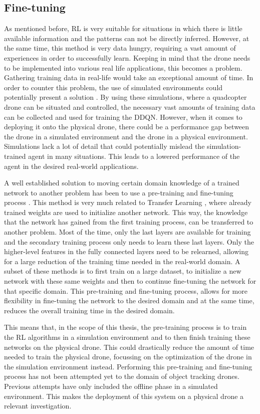 \subsection{Fine-tuning}
As mentioned before, RL is very suitable for situations 
in which there is little available information and the patterns can not be 
directly inferred. However, at the same time, this method is very data hungry, 
requiring a vast amount of experiences in order to successfully learn. Keeping in
mind that the drone needs to be implemented into various real life applications,
this becomes a problem. Gathering training data in real-life would take an 
exceptional amount of time. In order to counter this problem, the use of 
simulated environments could potentially present a solution \cite{DroneRLUsingTransferLearning}. By using these simulations, 
where a quadcopter drone can be situated and controlled, the necessary vast 
amounts of training data can be collected and used for training the DDQN. However, 
when it comes to deploying it onto the physical drone, there could 
be a performance gap between the drone in a simulated environment and the drone in a 
physical environment. Simulations lack a lot of detail that could potentially mislead the 
simulation-trained agent in many situations. This leads to a lowered performance of 
the agent in the desired real-world applications. 

A well established solution to moving certain domain knowledge of a trained 
network to another problem has been to use a pre-training and fine-tuning process \cite{pretrainingfinetuning}.
This method is very much related to Transfer Learning \cite{DroneRLUsingTransferLearning},
where already trained weights are used to initialize another network. This way, the knowledge 
that the network has gained from the first training process, can be transferred to another 
problem. Most of the time, only the last layers are available for training and the 
secondary training process only needs to learn these last layers. Only the higher-level 
features in the fully connected layers need to be relearned, allowing 
for a large reduction of the training time needed in the real-world domain. A subset of these
methods is to first train on a large dataset, to initialize a new network 
with these same weights and then to continue fine-tuning the network for that specific 
domain. This pre-training and fine-tuning process, allows for more flexibility in  
fine-tuning the network to the desired domain and at the same time, reduces the 
overall training time in the desired domain. 

This means that, in the scope of this thesis,
the pre-training process is to train the RL algorithms in a simulation environment and to 
then finish training these networks on the physical drone. This could drastically 
reduce the amount of time needed to train the physical drone, focussing on the optimization
of the drone in the simulation environment instead. Performing this pre-training 
and fine-tuning process has not been attempted yet to the domain of object tracking 
drones. Previous attempts have only included the offline phase in a simulated environment.
This makes the deployment of this system on a physical drone a relevant 
investigation. 